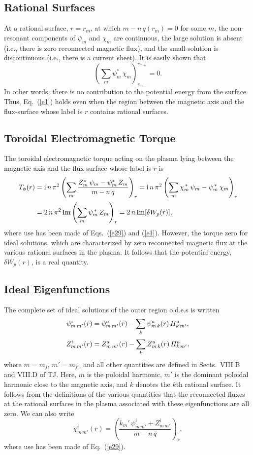 \documentclass[12pt,prb,aps,notitlepage]{revtex4-1}
\begin{document}
\subsection{Rational Surfaces}
At a rational surface, $r=r_m$, at which $m-n\,q(r_m)=0$ for some $m$, the non-resonant components of $\psi_m$ and $\chi_m$ are continuous, the 
large solution is absent (i.e., there is zero reconnected magnetic flux), and the small solution is discontinuous (i.e., there is a current sheet). It is easily shown that 
\begin{equation}
\left(\sum_m\psi_m^\ast\,\chi_m\right)_{r_{m-}}^{r_{m+}}=0.
\end{equation}
In other words, there is no contribution to the potential energy from the surface. Thus, Eq.~(\ref{e1}) holds even when the region between the
magnetic axis and the flux-surface whose label is $r$ contains rational surfaces. 

\subsection{Toroidal Electromagnetic Torque}
The toroidal electromagnetic torque acting on the plasma lying between the magnetic axis and the flux-surface whose label is $r$ is
\begin{align}
T_\phi(r)& = {\rm i}\,n\,\pi^2\left(\sum_m\frac{Z_m^\ast\,\psi_m-\psi_m^\ast\,Z_m}{m-n\,q}\right)_{r}= {\rm i}\,n\,\pi^2\left(\sum_m
\chi_m^{\,\ast}\,\psi_m - \psi_m^{\,\ast}\,\chi_m\right)_r\nonumber\\[0.5ex]
&= 2\,n\,\pi^2\,{\rm Im}\left(\sum_m\psi_m^{\,\ast}\,Z_m\right)_r= 2\,n\,{\rm Im}[\delta W_p(r)],
\end{align}
where use has been made of Eqs.~(\ref{e29}) and (\ref{e1}). 
However, the torque zero for ideal solutions, which are characterized by zero reconnected magnetic flux at the various rational surfaces in the plasma.
It follows that
 the potential energy, $\delta W_p(r)$, is a real quantity. 

\subsection{Ideal Eigenfunctions}
The complete set of ideal solutions of the outer region o.d.e.s is written
\begin{align}
\psi_{m\,m'}^i(r)&= \psi_{m\,m'}^a(r)-\sum_{k}\psi_{m\,k}^u(r)\,{\mit\Pi}_{k\,m'}^a,\\[0.5ex]
Z_{m\,m'}^i(r)&= Z_{m\,m'}^a(r)-\sum_{k}Z_{m\,k}^u(r)\,{\mit\Pi}_{k\,m'}^a,
\end{align}
where $m=m_j$, $m'=m_{j'}$, and all other quantities are defined in Sects.~VIII.B and VIII.D of TJ. 
Here, $m$ is the poloidal harmonic,  $m'$ is the dominant poloidal harmonic close to the magnetic axis, and $k$ denotes the $k$th rational surface. It follows
from the definitions of the various quantities that the reconnected fluxes at the rational surfaces in the plasma
associated with these eigenfunctions are all zero. We can also write
\begin{equation}\label{e39}
\chi^i_{m\,m'}(r) = \left(\frac{k_{m}'\,\psi^i_{m\,m'}+Z_{m\,m'}^i}{m-n\,q}\right)_r,
\end{equation}
where use has been made of Eq.~(\ref{e29}).
\end{document}
